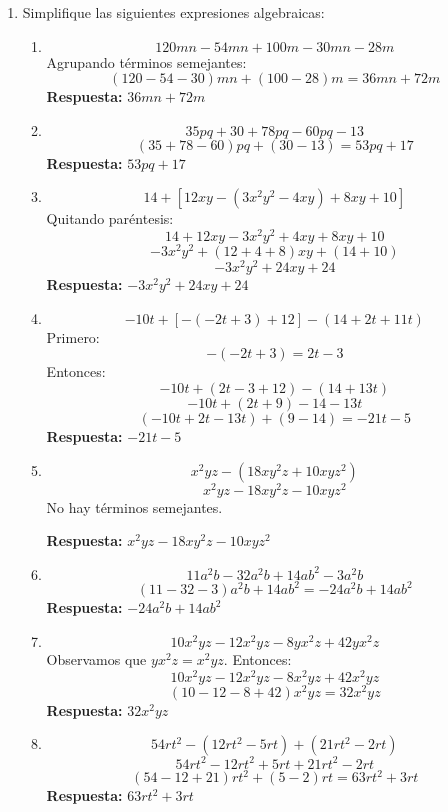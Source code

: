 \documentclass[12pt]{article}
\begin{document}
	\begin{enumerate}
		\item Simplifique las siguientes expresiones algebraicas:
		
		\begin{enumerate}[itemsep=0.5cm]
			\item 
			\[
			120mn - 54mn + 100m - 30mn - 28m
			\]
			Agrupando términos semejantes:
			\[
			(120 - 54 - 30)mn + (100 - 28)m = 36mn + 72m
			\]
			\textbf{Respuesta:} \(\boxed{36mn + 72m}\)
			
			\item 
			\[
			35pq + 30 + 78pq - 60pq - 13
			\]
			\[
			(35 + 78 - 60)pq + (30 - 13) = 53pq + 17
			\]
			\textbf{Respuesta:} \(\boxed{53pq + 17}\)
			
			\item 
			\[
			14 + [12xy - (3x^2y^2 - 4xy) + 8xy + 10]
			\]
			Quitando paréntesis:
			\[
			14 + 12xy - 3x^2y^2 + 4xy + 8xy + 10
			\]
			\[
			-3x^2y^2 + (12+4+8)xy + (14+10)
			\]
			\[
			-3x^2y^2 + 24xy + 24
			\]
			\textbf{Respuesta:} \(\boxed{-3x^2y^2 + 24xy + 24}\)
			
			\item 
			\[
			-10t + [ -(-2t + 3) + 12] - (14 + 2t + 11t)
			\]
			Primero:
			\[
			-(-2t+3)=2t-3
			\]
			Entonces:
			\[
			-10t + (2t - 3 + 12) - (14 + 13t)
			\]
			\[
			-10t + (2t + 9) - 14 - 13t
			\]
			\[
			(-10t+2t-13t) + (9-14) = -21t - 5
			\]
			\textbf{Respuesta:} \(\boxed{-21t - 5}\)
			
			\newpage
			
			\vspace*{1em}		
			
			
			\item 
			\[
			x^2yz - (18xy^2z + 10xyz^2)
			\]
			\[
			x^2yz - 18xy^2z - 10xyz^2
			\]
			No hay términos semejantes.
			
			\textbf{Respuesta:} \(\boxed{x^2yz - 18xy^2z - 10xyz^2}\)
			
			\item 
			\[
			11a^2b - 32a^2b + 14ab^2 - 3a^2b
			\]
			\[
			(11 - 32 - 3)a^2b + 14ab^2 = -24a^2b + 14ab^2
			\]
			\textbf{Respuesta:} \(\boxed{-24a^2b + 14ab^2}\)
			
			\item 
			\[
			10x^2yz - 12x^2yz - 8yx^2z + 42yx^2z
			\]
			Observamos que \(yx^2z = x^2yz\). Entonces:
			\[
			10x^2yz - 12x^2yz - 8x^2yz + 42x^2yz
			\]
			\[
			(10 - 12 - 8 + 42)x^2yz = 32x^2yz
			\]
			\textbf{Respuesta:} \(\boxed{32x^2yz}\)
			
			\item 
			\[
			54rt^2 - (12rt^2 - 5rt) + (21rt^2 - 2rt)
			\]
			\[
			54rt^2 - 12rt^2 + 5rt + 21rt^2 - 2rt
			\]
			\[
			(54 - 12 + 21)rt^2 + (5 - 2)rt = 63rt^2 + 3rt
			\]
			\textbf{Respuesta:} \(\boxed{63rt^2 + 3rt}\)
		\end{enumerate}
	\end{enumerate}
	
\end{document}
